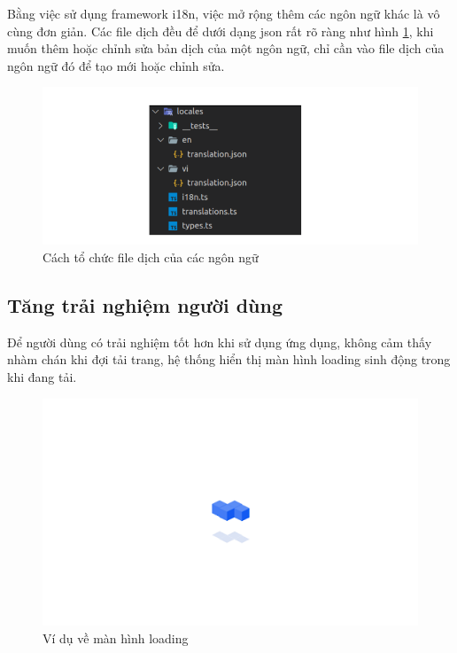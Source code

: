\documentclass[./../main.tex]{subfiles}
\begin{document}
Bằng việc sử dụng framework i18n, việc mở rộng thêm các ngôn ngữ khác là vô cùng đơn giản. Các file dịch đều để dưới dạng json rất rõ ràng như hình \ref{fig:example_i18n}, khi muốn thêm hoặc chỉnh sửa bản dịch của một ngôn ngữ, chỉ cần vào file dịch của ngôn ngữ đó để tạo mới hoặc chỉnh sửa.

\begin{figure}[H]
	\includegraphics[width=\linewidth, scale=0.5]{./images/image86.png}
	\caption{Cách tổ chức file dịch của các ngôn ngữ}
	\label{fig:example_i18n}
\end{figure}

\subsection{Tăng trải nghiệm người dùng}

Để người dùng có trải nghiệm tốt hơn khi sử dụng ứng dụng, không cảm thấy nhàm chán khi đợi tải trang, hệ thống hiển thị màn hình loading sinh động trong khi đang tải.

\begin{figure}[H]
	\includegraphics[width=\linewidth]{./images/image32.png}
	\caption{Ví dụ về màn hình loading}
	\label{fig:example_loading}
\end{figure}
\end{document}
